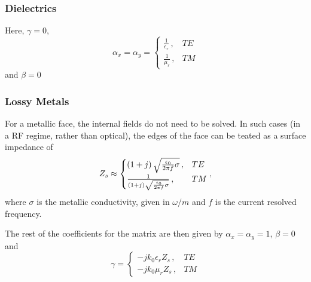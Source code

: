 \subsubsection{Dielectrics}
\label{ssubsec:dielectrics}
Here, $\gamma = 0$, 
\begin{equation}
\label{eq:dielectric alpha}
\alpha_x = \alpha_y = 
\begin{cases}
\frac{1}{\epsilon_r}\,, & TE \\
\frac{1}{\mu_r}\,, & TM
\end{cases} 
\end{equation}
and $\beta = 0$


\subsubsection{Lossy Metals}
\label{ssubsec:lossy_metals}
For a metallic face, the internal fields do not need to be solved. In such cases (in a RF regime, rather than optical), the edges of the face can be teated as a surface impedance of
\begin{equation}
\label{eq:surface impedance for lossy metals}
Z_s \approx 
\begin{cases}
\left({1 + j}\right)
\sqrt{
	\frac{\epsilon_0}
	{2\pi f}\sigma
} \,, &  TE \\
\frac{1}{\left({1 + j}\right)
\sqrt{
	\frac{\epsilon_0}
	{2\pi f}\sigma}
} \,,&  TM
\end{cases},
\end{equation}
where $\sigma$ is the metallic conductivity, given in $\omega/m$ and $f$ is the current resolved frequency.


The rest of the coefficients for the matrix are then given by $\alpha_x = \alpha_y = 1$, $\beta = 0$ and
\begin{equation}
\label{eq:Lossy metal gamma coeff}
\gamma = 
\begin{cases}
-j k_0 \epsilon_r Z_s\,, & TE \\
-j k_0 \mu_r Z_s\,, & TM
\end{cases}
\end{equation}


